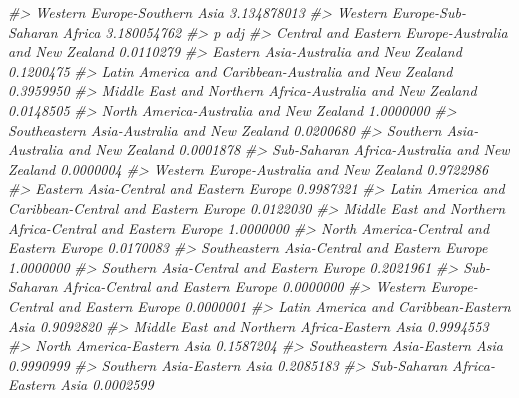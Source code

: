 \documentclass[
]{book}
\newenvironment{Shaded}{\begin{snugshade}}{\end{snugshade}}
\newcommand{\CommentTok}[1]{\textcolor[rgb]{0.56,0.35,0.01}{\textit{#1}}}
\theoremstyle{definition}
\theoremstyle{definition}
\theoremstyle{definition}
\theoremstyle{definition}
\theoremstyle{remark}
\begin{document}
\begin{Shaded}
\begin{Highlighting}[]
\CommentTok{\#\textgreater{} Western Europe{-}Southern Asia                                 3.134878013}
\CommentTok{\#\textgreater{} Western Europe{-}Sub{-}Saharan Africa                            3.180054762}
\CommentTok{\#\textgreater{}                                                                 p adj}
\CommentTok{\#\textgreater{} Central and Eastern Europe{-}Australia and New Zealand        0.0110279}
\CommentTok{\#\textgreater{} Eastern Asia{-}Australia and New Zealand                      0.1200475}
\CommentTok{\#\textgreater{} Latin America and Caribbean{-}Australia and New Zealand       0.3959950}
\CommentTok{\#\textgreater{} Middle East and Northern Africa{-}Australia and New Zealand   0.0148505}
\CommentTok{\#\textgreater{} North America{-}Australia and New Zealand                     1.0000000}
\CommentTok{\#\textgreater{} Southeastern Asia{-}Australia and New Zealand                 0.0200680}
\CommentTok{\#\textgreater{} Southern Asia{-}Australia and New Zealand                     0.0001878}
\CommentTok{\#\textgreater{} Sub{-}Saharan Africa{-}Australia and New Zealand                0.0000004}
\CommentTok{\#\textgreater{} Western Europe{-}Australia and New Zealand                    0.9722986}
\CommentTok{\#\textgreater{} Eastern Asia{-}Central and Eastern Europe                     0.9987321}
\CommentTok{\#\textgreater{} Latin America and Caribbean{-}Central and Eastern Europe      0.0122030}
\CommentTok{\#\textgreater{} Middle East and Northern Africa{-}Central and Eastern Europe  1.0000000}
\CommentTok{\#\textgreater{} North America{-}Central and Eastern Europe                    0.0170083}
\CommentTok{\#\textgreater{} Southeastern Asia{-}Central and Eastern Europe                1.0000000}
\CommentTok{\#\textgreater{} Southern Asia{-}Central and Eastern Europe                    0.2021961}
\CommentTok{\#\textgreater{} Sub{-}Saharan Africa{-}Central and Eastern Europe               0.0000000}
\CommentTok{\#\textgreater{} Western Europe{-}Central and Eastern Europe                   0.0000001}
\CommentTok{\#\textgreater{} Latin America and Caribbean{-}Eastern Asia                    0.9092820}
\CommentTok{\#\textgreater{} Middle East and Northern Africa{-}Eastern Asia                0.9994553}
\CommentTok{\#\textgreater{} North America{-}Eastern Asia                                  0.1587204}
\CommentTok{\#\textgreater{} Southeastern Asia{-}Eastern Asia                              0.9990999}
\CommentTok{\#\textgreater{} Southern Asia{-}Eastern Asia                                  0.2085183}
\CommentTok{\#\textgreater{} Sub{-}Saharan Africa{-}Eastern Asia                             0.0002599}

\end{Highlighting}
\end{Shaded}
\end{document}
